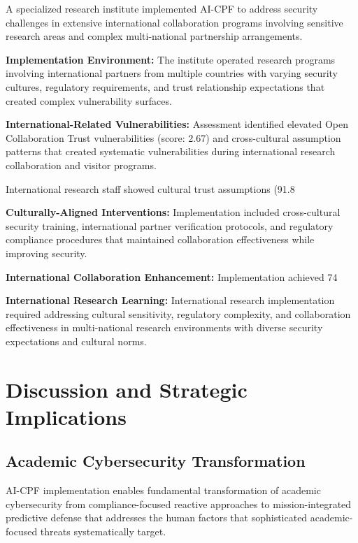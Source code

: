\documentclass[10pt, twocolumn]{article}
\begin{document}
A specialized research institute implemented AI-CPF to address security challenges in extensive international collaboration programs involving sensitive research areas and complex multi-national partnership arrangements.

\textbf{Implementation Environment:} The institute operated research programs involving international partners from multiple countries with varying security cultures, regulatory requirements, and trust relationship expectations that created complex vulnerability surfaces.

\textbf{International-Related Vulnerabilities:} Assessment identified elevated Open Collaboration Trust vulnerabilities (score: 2.67) and cross-cultural assumption patterns that created systematic vulnerabilities during international research collaboration and visitor programs.

International research staff showed cultural trust assumptions (91.8%

\textbf{Culturally-Aligned Interventions:} Implementation included cross-cultural security training, international partner verification protocols, and regulatory compliance procedures that maintained collaboration effectiveness while improving security.

\textbf{International Collaboration Enhancement:} Implementation achieved 74%

\textbf{International Research Learning:} International research implementation required addressing cultural sensitivity, regulatory complexity, and collaboration effectiveness in multi-national research environments with diverse security expectations and cultural norms.

\section{Discussion and Strategic Implications}

\subsection{Academic Cybersecurity Transformation}

AI-CPF implementation enables fundamental transformation of academic cybersecurity from compliance-focused reactive approaches to mission-integrated predictive defense that addresses the human factors that sophisticated academic-focused threats systematically target.
\end{document}
